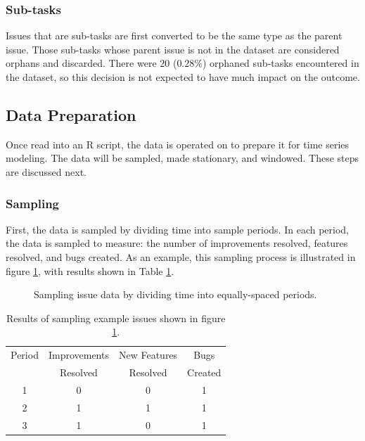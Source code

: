 \documentclass[a4paper]{scrartcl}
\begin{document}
\subsubsection*{Sub-tasks}
Issues that are sub-tasks are first converted to be the same type as the parent issue. Those sub-tasks whose parent issue is not in the dataset are considered orphans and discarded. There were $20$ ($0.28\%$) orphaned sub-tasks encountered in the dataset, so this decision is not expected to have much impact on the outcome.

\subsection*{Data Preparation}
Once read into an R script, the data is operated on to prepare it for time series modeling. The data will be sampled, made stationary, and windowed. These steps are discussed next.

\subsubsection*{Sampling}

First, the data is sampled by dividing time into sample periods. In each period, the data is sampled to measure: the number of improvements resolved, features resolved, and bugs created. As an example, this sampling process is illustrated in figure \ref{fig:sampling_issue_data}, with results shown in Table \ref{tab:sampling_issue_data}.

\begin{figure}[h!]
\begin{center}
\caption{Sampling issue data by dividing time into equally-spaced periods.}
\label{fig:sampling_issue_data}
\end{center}
\end{figure}

\begin{table}[h!]
\caption{Results of sampling example issues shown in figure \ref{fig:sampling_issue_data}.}
\centering
\begin{tabular}{ c | c | c | c }
\hline
Period & Improvements & New Features & Bugs \\
~& Resolved & Resolved & Created \\
\hline
1 & 0 & 0 & 1 \\
2 & 1 & 1 & 1 \\
3 & 1 & 0 & 1 \\
\hline
\end{tabular}
\label{tab:sampling_issue_data}
\end{table}
\end{document}

